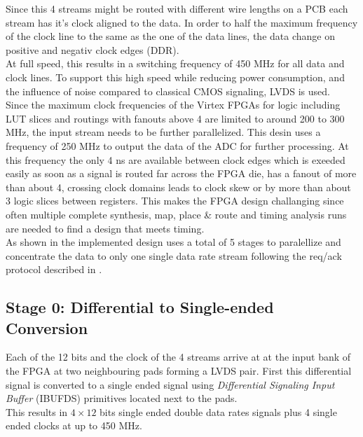 Since this 4 streams might be routed with different wire lengths on a \gls{PCB}
each stream has it's clock aligned to the data.
In order to half the maximum frequency of the clock line to the same as the one
of the data lines, the data change on positive and negativ clock edges
(\gls{DDR}). \\

At full speed, this results in a switching frequency of 450 MHz for all data
and clock lines. To support this high speed while reducing power consumption,
and the influence of noise compared to classical \gls{CMOS} signaling,
\gls{LVDS} is used. \\

Since the maximum clock frequencies of the Virtex \glspl{FPGA} for logic
including \gls{LUT} slices and routings with fanouts above 4
are limited to around 200 to 300 MHz, the input stream needs to be further
parallelized. This desin uses a frequency of 250 MHz to output
the data of the \gls{ADC} for further processing. At this frequency
the only 4 ns are available between clock edges which is exeeded easily
as soon as a signal is routed far across the \gls{FPGA} die,
has a fanout of more than about 4, crossing clock domains leads
to clock skew or by more than about 3 logic slices between registers.
This makes the \gls{FPGA} design challanging since often multiple
complete synthesis, map, place \& route and timing analysis runs are
needed to find a design that meets timing. \\

As shown in  the implemented design uses
a total of 5 stages to paralellize and concentrate the data to only
one single data rate stream following the req/ack protocol described in
.

\subsection{Stage 0: Differential to Single-ended Conversion}
Each of the 12 bits and the clock of the 4 streams arrive at at the input bank
of the \gls{FPGA} at two neighbouring pads forming a \gls{LVDS} pair.
First this differential signal is converted to a single ended signal using
{\em Differential Signaling Input Buffer} (IBUFDS) primitives located next
to the pads. \\

This results in $4 \times 12$ bits single ended double data rates
signals plus 4 single ended clocks at up to 450 MHz.

